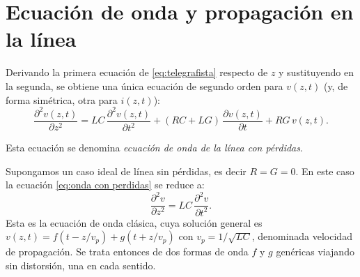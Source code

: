 \section{Ecuación de onda y propagación en la línea}\label{sec:ecuacion de onda}

Derivando la primera ecuación de \eqref{eq:telegrafista} respecto de $z$ y sustituyendo en la segunda, se obtiene una única ecuación de segundo orden para $v(z,t)$ (y, de forma simétrica, otra para $i(z,t)$):
\begin{equation}\label{eq:onda con perdidas}
    \frac{\partial^2 v(z,t)}{\partial z^2} = LC\, \frac{\partial^2 v(z,t)}{\partial t^2} + (RC+LG)\, \frac{\partial v(z,t)}{\partial t} + RG\, v(z,t).
\end{equation}

Esta ecuación se denomina \emph{ecuación de onda de la línea con pérdidas}.

\begin{ejemplo}
    Supongamos un caso ideal de línea sin pérdidas, es decir $R=G=0$. En este caso la ecuación \eqref{eq:onda con perdidas} se reduce a:
    \begin{equation*}
        \frac{\partial^2 v}{\partial z^2} = LC\, \frac{\partial^2 v}{\partial t^2}.
    \end{equation*}
Esta es la ecuación de onda clásica, cuya solución general es $v(z,t) = f(t-z/v_p) + g(t+z/v_p)$ con $v_p=1/\sqrt{LC}$, denominada velocidad de propagación. Se trata entonces de dos formas de onda $f$ y $g$ genéricas viajando sin distorsión, una en cada sentido.
\end{ejemplo}

